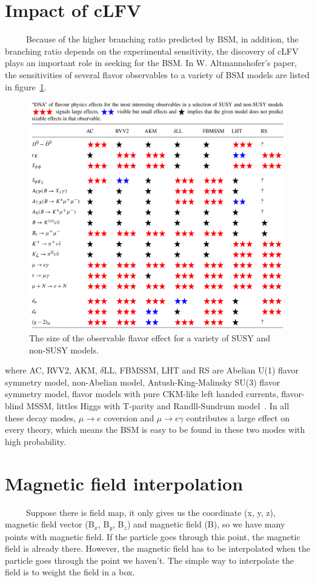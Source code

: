 \newpage
\section{Impact of cLFV}
~~~~~Because of the higher branching ratio predicted by BSM, in addition, the branching ratio depends on the experimental sensitivity, the discovery of cLFV plays an important role in seeking for the BSM.
In W. Altmannshofer's paper, the sensitivities of several flavor observables to a variety of BSM models are listed in figure~\ref{predict}.
\begin{figure}[H]
 \centering
 \includegraphics[scale=0.7]{chapter1/fig/predict.pdf}
 \caption{The size of the observable flavor effect for a variety of SUSY and non-SUSY models.}
 \label{predict}
\end{figure}
where AC, RVV2, AKM, $\delta$LL, FBMSSM, LHT and RS are Abelian U(1) flavor symmetry model, non-Abelian model, Antush-King-Malinsky SU(3) flavor symmetry model, flavor models with pure CKM-like left handed currents, flavor-blind MSSM, littles Higgs with T-parity and Randll-Sundrum model~\cite{wolf}.
In all these decay modes, $\mu \rightarrow e$ coversion and $\mu \rightarrow e\gamma$ contributes a large effect on every theory, which means the BSM is easy to be found in these two modes with high probability.

\newpage
\section{Magnetic field interpolation}
~~~~~Suppose there is field map, it only gives us the coordinate (x, y, z), magnetic field vector (B$_x$, B$_y$, B$_z$) and magnetic field (B), so we have many points with magnetic field.
If the particle goes through this point, the magnetic field is already there.
However, the magnetic field has to be interpolated when the particle goes through the point we haven't.
The simple way to interpolate the field is to weight the field in a box.

